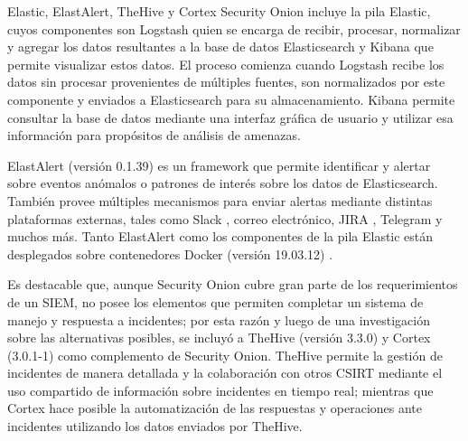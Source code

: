    \begin{section}{Elastic, ElastAlert, TheHive y Cortex}
        Security Onion incluye la pila Elastic, cuyos componentes son Logstash quien se encarga de recibir, procesar, normalizar y agregar los datos resultantes a la base de datos  Elasticsearch y Kibana que permite visualizar estos datos. El proceso comienza cuando Logstash recibe los datos sin procesar provenientes de múltiples fuentes, son normalizados por este componente y enviados a Elasticsearch para su almacenamiento. Kibana permite consultar la base de datos mediante una interfaz gráfica de usuario y utilizar esa información para propósitos de análisis de amenazas. \par
        ElastAlert (versión 0.1.39) es un framework que permite identificar y alertar sobre eventos anómalos o patrones de interés sobre los datos de Elasticsearch. También provee múltiples mecanismos para enviar alertas mediante distintas plataformas externas, tales como Slack \cite{slack}, correo electrónico, JIRA \cite{jira}, Telegram \cite{telegram} y muchos más. Tanto ElastAlert como los componentes de la pila Elastic están desplegados sobre contenedores Docker (versión 19.03.12) \cite{docker}. \par
        Es destacable que, aunque Security Onion cubre gran parte de los requerimientos de un SIEM, no posee los elementos que permiten completar un sistema de manejo y respuesta a incidentes; por esta razón y luego de una investigación sobre las alternativas posibles, se incluyó a TheHive (versión 3.3.0) \cite{thehive} y Cortex (3.0.1-1) \cite{thehive} como complemento de Security Onion. TheHive permite la gestión de incidentes de manera detallada y la colaboración con otros CSIRT mediante el uso compartido de información sobre incidentes en tiempo real; mientras que Cortex hace posible la automatización de las respuestas y operaciones ante incidentes utilizando los datos enviados por TheHive. \par

   \end{section}
